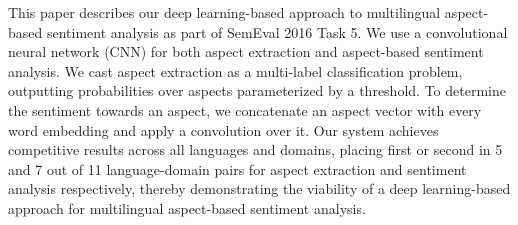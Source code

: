 This paper describes our deep learning-based approach to multilingual aspect-based sentiment analysis as part of SemEval 2016 Task 5. We use a convolutional neural network (CNN) for both aspect extraction and aspect-based sentiment analysis. We cast aspect extraction as a multi-label classification problem, outputting probabilities over aspects parameterized by a threshold. To determine the sentiment towards an aspect, we concatenate an aspect vector with every word embedding and apply a convolution over it. Our system achieves competitive results across all languages and domains, placing first or second in 5 and 7 out of 11 language-domain pairs for aspect extraction and sentiment analysis respectively, thereby demonstrating the viability of a deep learning-based approach for multilingual aspect-based sentiment analysis.
